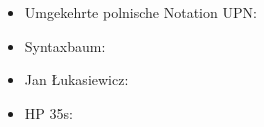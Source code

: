 {{%
\section*{\BrochureWebsitesAndKeywords}
{\raggedright
\begin{itemize}
  \item Umgekehrte polnische Notation UPN: \href{https://de.wikipedia.org/wiki/Umgekehrte_polnische_Notation}{}
  \item Syntaxbaum: \href{https://de.wikipedia.org/wiki/Syntaxbaum}{}
  \item Jan Łukasiewicz: \href{https://de.wikipedia.org/wiki/Jan_\%C5\%81ukasiewicz}{}
  \item HP 35s: \href{https://en.wikipedia.org/wiki/HP_35s}{}
\end{itemize}


}

}{}

\def\AuthorUngureanuL{} %
\def\AuthorConstantinescuR{} %
\def\AuthorIoannouT{} %
\def\AuthorReyesO{} %
\def\AuthorAnwarK{} %
\def\AuthorKhachatryanG{} %
\def\AuthorDatzkoC{} %
\def\AuthorPohlW{} %
\def\AuthorDatzkoThutS{} %

\newpage}{}
